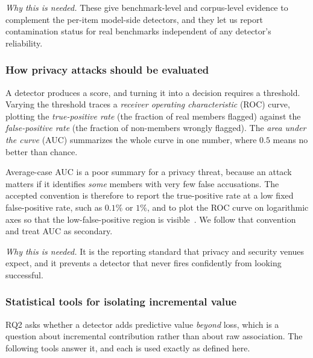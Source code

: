 \emph{Why this is needed.} These give benchmark-level and corpus-level evidence to
complement the per-item model-side detectors, and they let us report contamination status
for real benchmarks independent of any detector's reliability.

\subsubsection{How privacy attacks should be evaluated}
A detector produces a score, and turning it into a decision requires a threshold. Varying
the threshold traces a \emph{receiver operating characteristic} (ROC) curve, plotting the
\emph{true-positive rate} (the fraction of real members flagged) against the
\emph{false-positive rate} (the fraction of non-members wrongly flagged). The
\emph{area under the curve} (AUC) summarizes the whole curve in one number, where $0.5$
means no better than chance.

Average-case AUC is a poor summary for a privacy threat, because an attack matters if it
identifies \emph{some} members with very few false accusations. The accepted convention is
therefore to report the true-positive rate at a low fixed false-positive rate, such as
$0.1\%$ or $1\%$, and to plot the ROC curve on logarithmic axes so that the
low-false-positive region is visible~\citep{carlini2022lira}. We follow that convention
and treat AUC as secondary.

\emph{Why this is needed.} It is the reporting standard that privacy and security venues
expect, and it prevents a detector that never fires confidently from looking successful.

\subsubsection{Statistical tools for isolating incremental value}
RQ2 asks whether a detector adds predictive value \emph{beyond} loss, which is a question
about incremental contribution rather than about raw association. The following tools
answer it, and each is used exactly as defined here.

